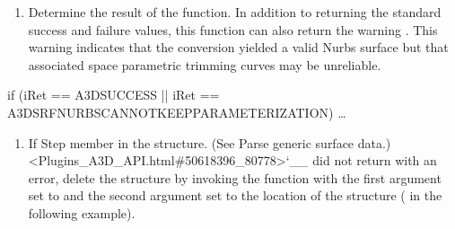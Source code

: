 \documentclass[letterpaper,12pt,english,openany,oneside]{sphinxmanual}
\begin{document}
\begin{sphinxVerbatim}[commandchars=\\\{\}]
   
 
     
   
\end{sphinxVerbatim}
\begin{enumerate}
%
\setcounter{enumi}{2}
\item {} 
Determine the result of the  function. In addition to returning the standard success and failure values, this function can also return the warning . This warning indicates that the conversion yielded a valid Nurbs surface but that associated space parametric trimming curves may be unreliable.

\end{enumerate}

\begin{sphinxVerbatim}[commandchars=\\\{\}]
if (iRet == A3D\PYGZus{}SUCCESS ||
  iRet == A3D\PYGZus{}SRF\PYGZus{}NURBS\PYGZus{}CANNOT\PYGZus{}KEEP\PYGZus{}PARAMETERIZATION) \PYGZob{}
  …
\PYGZcb{}
\end{sphinxVerbatim}
\begin{enumerate}
%
\item {} 
If Step  member in the  structure. (See Parse generic surface data.) <Plugins\_A3D\_API.html\#50618396\_80778>`\_\_ did not return with an error, delete the  structure by invoking the  function with the first argument set to  and the second argument set to the location of the structure ( in the following example).

\end{enumerate}
\end{document}
